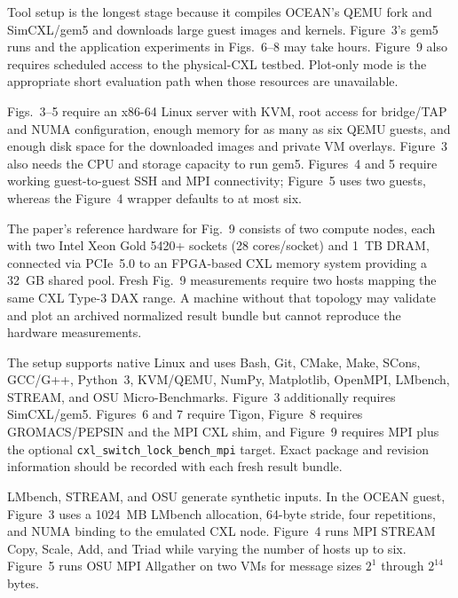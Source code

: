 \documentclass[conference]{IEEEtran}
\begin{document}
\arttime

Tool setup is the longest stage because it compiles OCEAN's QEMU fork and
SimCXL/gem5 and downloads large guest images and kernels.  Figure~3's gem5
runs and the application experiments in Figs.~6--8 may take hours.  Figure~9
also requires scheduled access to the physical-CXL testbed.  Plot-only mode is
the appropriate short evaluation path when those resources are unavailable.

\artin


Figs.~3--5 require an x86-64 Linux server with KVM, root access for bridge/TAP
and NUMA configuration, enough memory for as many as six QEMU guests, and
enough disk space for the downloaded images and private VM overlays.  Figure~3
also needs the CPU and storage capacity to run gem5.  Figures~4 and 5 require
working guest-to-guest SSH and MPI connectivity; Figure~5 uses two guests,
whereas the Figure~4 wrapper defaults to at most six.

The paper's reference hardware for Fig.~9 consists of two compute nodes, each with two
Intel Xeon Gold 5420+ sockets (28 cores/socket) and 1~TB DRAM, connected via
PCIe~5.0 to an FPGA-based CXL memory system providing a 32~GB shared pool.
Fresh Fig.~9 measurements require two hosts mapping the same CXL Type-3 DAX
range.  A machine without that topology may validate and plot an archived
normalized result bundle but cannot reproduce the hardware measurements.


The setup supports native Linux and uses Bash, Git, CMake, Make, SCons,
GCC/G++, Python~3, KVM/QEMU, NumPy, Matplotlib, OpenMPI, LMbench, STREAM, and
OSU Micro-Benchmarks.  Figure~3 additionally requires SimCXL/gem5.  Figures~6
and 7 require Tigon, Figure~8 requires GROMACS/PEPSIN and the MPI CXL shim, and
Figure~9 requires MPI plus the optional
\texttt{cxl\_switch\_lock\_bench\_mpi} target.  Exact package and revision
information should be recorded with each fresh result bundle.


LMbench, STREAM, and OSU generate synthetic inputs.  In the OCEAN guest,
Figure~3 uses a 1024~MB LMbench allocation, 64-byte stride, four repetitions,
and NUMA binding to the emulated CXL node.  Figure~4 runs MPI STREAM Copy,
Scale, Add, and Triad while varying the number of hosts up to six.  Figure~5
runs OSU MPI Allgather on two VMs for message sizes $2^1$ through $2^{14}$
bytes.
\end{document}
